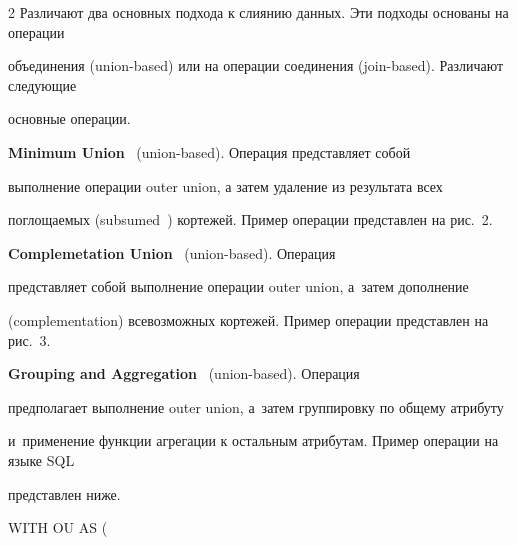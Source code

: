 \begin{multicols}{2}
  Различают два основных подхода к слиянию данных. Эти подходы основаны на операции

объединения (union-based) или на операции соединения (join-based). Различают следующие

основные операции.



  \textbf{Minimum Union}~\cite{11-vov} (union-based). Операция представляет собой

выполнение операции {\sf outer union}, а затем удаление из результата всех

поглощаемых (subsumed~\cite{11-vov}) кортежей. Пример операции представлен на рис.~2.





  \textbf{Complemetation Union}~\cite{11-vov} (union-based). Операция

представляет собой выполнение операции {\sf outer union}, а~затем дополнение

(complementation) всевозможных кортежей. Пример операции представлен на рис.~3.







  \textbf{Grouping and Aggregation}~\cite{11-vov} (union-based). Операция

предполагает выполнение {\sf outer union}, а~затем группировку по общему атрибуту

и~применение функции агрегации к остальным атрибутам. Пример операции на языке SQL

представлен ниже.

\smallskip



\noindent

{\sf   WITH OU AS ( }



\noindent

\hspace*{3pt}{\sf   (SELECT A, B, C, NULL AS D FROM U1)}



\noindent

\hspace*{12pt}{\sf UNION (ALL)}



\noindent

\hspace*{3pt}{\sf (SELECT A, B, NULL AS C, D FROM U2)),}






\end{multicols}
